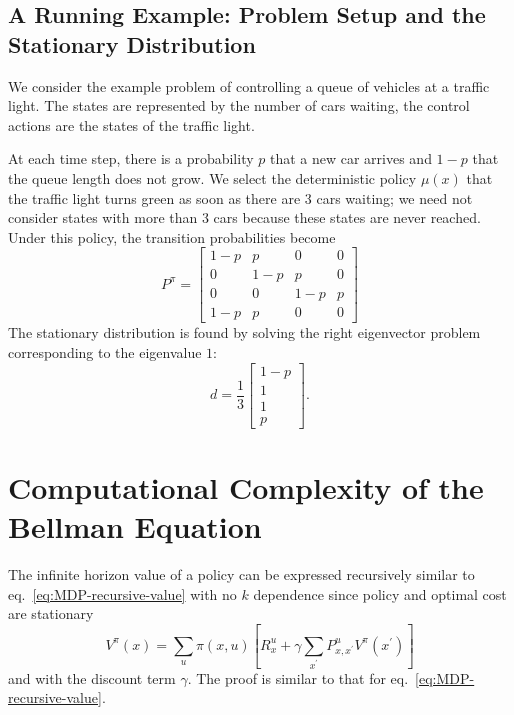 \subsection{A Running Example: Problem Setup and the Stationary Distribution}

We consider the  example problem of controlling a queue of vehicles at a traffic light. The states are represented by the number of cars waiting, the control actions are the states of the traffic light.

At each time step, there is a probability $p$ that a new car arrives and $1-p$ that the queue length does not grow. We select the deterministic policy $\mu(x)$ that the traffic light turns green as soon as there are 3 cars waiting; we need not consider states with more than 3 cars because these states are never reached. Under this policy, the transition probabilities become
\begin{equation*}
  P^\pi =
  \begin{bmatrix}
    1-p & p & 0 & 0 \\
    0 & 1-p & p & 0 \\
    0 & 0 & 1-p & p \\
    1-p & p & 0 & 0
  \end{bmatrix}
\end{equation*}
The stationary distribution is found by solving the right eigenvector problem corresponding to the eigenvalue $1$:
\begin{equation*}
  d =
  \frac{1}{3}\begin{bmatrix}
               1-p \\ 1 \\ 1 \\ p
  \end{bmatrix}.
\end{equation*}

\section{Computational Complexity of the Bellman Equation}
\label{sec:MDP-computation-complexity-bellman-eq}

The infinite horizon value of a policy can be expressed recursively similar to eq.~\eqref{eq:MDP-recursive-value} with no $k$ dependence since policy and optimal cost are stationary
\begin{equation}
  \label{eq:MDP-recursive-value-infinite-horizon}
  V^\pi(x) = \sum_u \pi(x,u)\left[R^u_x + \gamma \sum_{x^\prime}P^u_{x,x^\prime} V^\pi(x^\prime)\right]
\end{equation}
and with the discount term $\gamma$. The proof is similar to that for eq.~\eqref{eq:MDP-recursive-value}.


